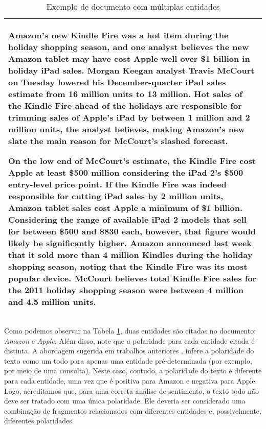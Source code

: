 \documentclass[a4paper,12pt]{article}
\begin{document}
\begin{table}[h!]
\begin{tabular}{|l|}
\hline
\begin{minipage}[t]{1.0\columnwidth}

Amazon’s new Kindle Fire was a hot item during the holiday shopping season, and one analyst believes the new Amazon tablet may have cost Apple well over \$1 billion in holiday iPad sales. Morgan Keegan analyst Travis McCourt on Tuesday lowered his December-quarter iPad sales estimate from 16 million units to 13 million. 
Hot sales of the Kindle Fire ahead of the holidays are responsible for trimming sales of Apple’s iPad by between 1 million and 2 million units, the analyst believes, making Amazon’s new slate the main reason for McCourt’s slashed forecast.

On the low end of McCourt’s estimate, the Kindle Fire cost Apple at least \$500 million considering the iPad 2's \$500 entry-level price point. If the Kindle Fire was indeed responsible for cutting iPad sales by 2 million units, Amazon tablet sales cost Apple a minimum of \$1 billion. Considering the range of available iPad 2 models that sell for between \$500 and \$830 each, however, that figure would likely be significantly higher.
Amazon announced last week that it sold more than 4 million Kindles during the holiday shopping season, noting that the Kindle Fire was its most popular device. McCourt believes total Kindle Fire sales for the 2011 holiday shopping season were between 4 million and 4.5 million units.

\end{minipage}\tabularnewline
\hline
\end{tabular}
\caption{Exemplo de documento com múltiplas entidades}
\label{tab:exemplo1}
\end{table}

Como podemos observar na Tabela \ref{tab:exemplo1}, duas entidades são citadas no documento: \textit{Amazon} e \textit{Apple}. Além disso, note que a polaridade para cada entidade citada é distinta. A abordagem sugerida em trabalhos anteriores \cite{pablotese,cohesion}, infere a polaridade do texto como um todo para apenas uma entidade pré-determinada (por exemplo, por meio de uma consulta). Neste caso, contudo, a polaridade do texto é diferente para cada entidade, uma vez que é positiva para Amazon e negativa para Apple. Logo, acreditamos que, para uma correta análise de sentimento, o texto todo não deve ser tratado com uma única polaridade. Ele deveria ser considerado uma combinação de fragmentos relacionados com diferentes entidades e, possivelmente, diferentes polaridades.
\end{document}
